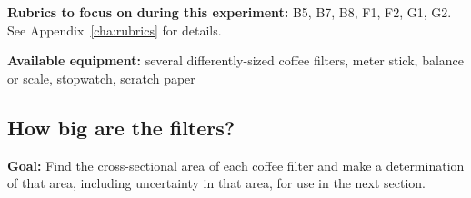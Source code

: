 \textbf{Rubrics to focus on during this experiment:} B5, B7, B8, F1, F2, G1, G2. See Appendix~\ref{cha:rubrics} for details.

\textbf{Available equipment:} several differently-sized coffee filters, meter stick, balance or scale, stopwatch, scratch paper%

\subsection{How big are the filters?}


\textbf{Goal:} Find the cross-sectional area of each coffee filter and make a determination of that area, including uncertainty in that area, for use in the next section.
 

